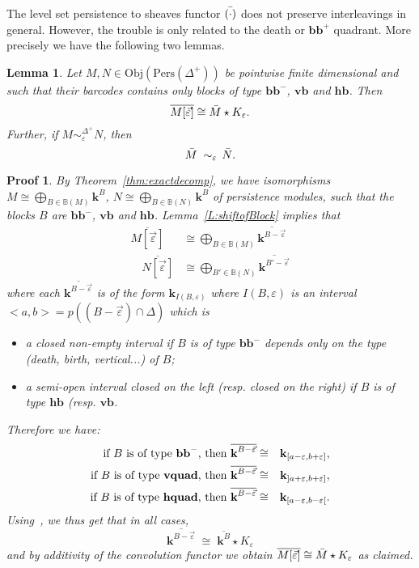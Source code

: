 \documentclass[a4paper, english, 11pt]{article}
\newcommand{\kk}[0]{\textbf{k}}
\newcommand{\Pe}{\text{Pers}}
\newcommand{\0}{\vec{0}}
\newcommand{\Obj}[0]{\text{Obj}}
\newtheorem*{pf}{Proof} }
\newtheorem{lem}[prop]{Lemma}
\begin{document}
The level set persistence to sheaves functor $\Bar{(\cdot)}$ does not preserve
interleavings in general. However, the trouble is only related to the death or $\textbf{bb}^+$ quadrant. More precisely we have the following two lemmas.
\begin{lem}\label{L:Barpreserveentre} Let $M, N\in \Obj(\Pe(\Delta^+))$ be pointwise finite dimensional and such that their barcodes contains only blocks of type $\textbf{bb}^{-}$, $\textbf{vb}$ and $\textbf{hb}$. 
Then $$\overline{M [\vec{\varepsilon}]} \cong \Bar{M}\star K_{\varepsilon}. $$ Further, 
if $M \sim_\varepsilon^{\Delta^+} N$, then 
 $$ \Bar{M} \; \sim_\varepsilon \, \Bar{N}.$$
\end{lem}
\begin{pf}
 By Theorem~\ref{thm:exactdecomp}, we have  isomorphisms 
 $M \cong\bigoplus_{B\in \mathbb{B}(M)} \kk^B$, 
 $N \cong \bigoplus_{B\in \mathbb{B}(N)} \kk^B$ of persistence modules, such that the blocks $B$ are $\textbf{bb}^{-}$, $\textbf{vb}$ and $\textbf{hb}$. Lemma~\ref{L:shiftofBlock} 
 implies that 
 \begin{align*}\overline{M[\vec{\varepsilon}]} &\cong \bigoplus_{B\in \mathbb{B}(M)} \overline{\kk^{B -\vec{\varepsilon}}}  \\ 
  \quad \overline{N[\vec{\varepsilon}]} &\cong \bigoplus_{B'\in \mathbb{B}(N)} \overline{\kk^{B' -\vec{\varepsilon}} }
  \end{align*}
 where each $\overline{\kk^{B -\vec{\varepsilon}}}$ is of the form 
 $\kk_{I(B, \varepsilon)}$ where $I(B, \varepsilon)$ is an interval $<a,b>=p((B-\vec{\varepsilon})\cap \Delta)$ which is
 \begin{itemize}\item a closed non-empty interval if $B$ is of type $\textbf{bb}^{-}$ depends only on the type (death, birth, vertical...) of $B$; 
  \item a semi-open interval closed on the left (resp. closed on the right) if  $B$ is of type $\textbf{hb}$ (resp. $\textbf{vb}$.
 \end{itemize}
Therefore we have: 
\begin{eqnarray*} 
 \text{if $B$ is of type $\textbf{bb}^{-}$, then }  \overline{\kk^{B-\vec{\varepsilon}}} 
 & \cong & \kk_{[a-\varepsilon, b+\varepsilon ]}, \\
 \text{if $B$ is of type \textbf{vquad}, then }  \overline{\kk^{B-\vec{\varepsilon}}} 
 & \cong & \kk_{]a+\varepsilon, b+\varepsilon ]}, \\
 \text{if $B$ is of type \textbf{hquad}, then }  \overline{\kk^{B-\vec{\varepsilon}}} 
 & \cong & \kk_{[a-\varepsilon, b-\varepsilon [}.
\end{eqnarray*}
 Using~\cite[Proposition 3.8]{Berk18}, we thus get that  in all cases, 
 $$ \overline{\kk^{B-\vec{\varepsilon}}} 
 \; \cong \;  \overline{\kk^B} \star K_\varepsilon $$ and by additivity of the convolution functor we obtain $\overline{M [\vec{\varepsilon}]} \cong \Bar{M}\star K_{\varepsilon}$ as claimed.
 

\end{pf}
\end{document}

